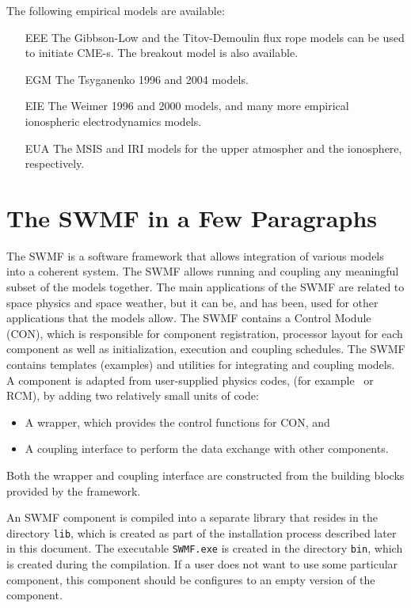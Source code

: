 The following empirical models are available:
\begin{itemize}
\item[EEE] The Gibbson-Low and the Titov-Demoulin flux rope models
          can be used to initiate CME-s. The breakout model is
          also available.
\item[EGM] The Tsyganenko 1996 and 2004 models.
\item[EIE] The Weimer 1996 and 2000 models, and many more empirical
          ionospheric electrodynamics models.
\item[EUA] The MSIS and IRI models for the upper atmospher and the 
          ionosphere, respectively.
\end{itemize}

\section{The SWMF in a Few Paragraphs}

The SWMF is a software framework that allows integration
of various models into a coherent system. The SWMF allows
running and coupling any meaningful subset of the models together.
The main applications of the SWMF are related to space
physics and space weather, but it can be, and has been, used for 
other applications that the models allow.
The SWMF contains a Control Module (CON), which is responsible for
component registration, processor layout for each component as well
as initialization, execution and coupling schedules.  
The SWMF contains templates (examples) and utilities for 
integrating and coupling models. 
A component is adapted from user-supplied physics codes,
(for example \BATSRUS\ or RCM), by adding two relatively small units
of code:
\begin{itemize}
\item A wrapper, which provides the control functions for CON, and
\item A coupling interface to perform the data exchange with other
components.
\end{itemize}
Both the wrapper and coupling interface are constructed from the
building blocks provided by the framework. 

An SWMF component is compiled into a separate library that resides in
the directory {\tt lib}, which is created as part of the installation
process described later in this document. The executable {\tt SWMF.exe}
is created in the
directory {\tt bin}, which is created during the compilation.  If a
user does not want to use some particular component, this component
should be configures to an empty version of the component.

